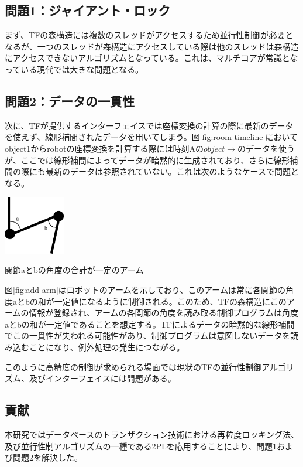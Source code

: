 \documentclass{jarticle}
\begin{document}
\begin{multicols}{2}
\subsection*{問題1：ジャイアント・ロック}
まず、TFの森構造には複数のスレッドがアクセスするため並行性制御が必要となるが、一つのスレッドが森構造にアクセスしている際は他のスレッドは森構造にアクセスできないアルゴリズムとなっている。これは、マルチコアが常識となっている現代では大きな問題となる。

\subsection*{問題2：データの一貫性}
次に、TFが提供するインターフェイスでは座標変換の計算の際に最新のデータを使えず、線形補間されたデータを用いてしまう。図\ref{fig:room-timeline}においてobject1からrobotの座標変換を計算する際には時刻Aの$object \rightarrow$のデータを使うが、ここでは線形補間によってデータが暗黙的に生成されており、さらに線形補間の際にも最新のデータは参照されていない。これは次のようなケースで問題となる。

\begin{figurehere} 
\centering
\includegraphics[width=0.2\textwidth]{add-arm}	
\caption{関節aとbの角度の合計が一定のアーム}
\label{fig:add-arm}
\end{figurehere}

図\ref{fig:add-arm}はロボットのアームを示しており、このアームは常に各関節の角度aとbの和が一定値になるように制御される。このため、TFの森構造にこのアームの情報が登録され、アームの各関節の角度を読み取る制御プログラムは角度aとbの和が一定値であることを想定する。TFによるデータの暗黙的な線形補間でこの一貫性が失われる可能性があり、制御プログラムは意図しないデータを読み込むことになり、例外処理の発生につながる。

このように高精度の制御が求められる場面では現状のTFの並行性制御アルゴリズム、及びインターフェイスには問題がある。

\subsection{貢献}

本研究ではデータベースのトランザクション技術における再粒度ロッキング法、及び並行性制アルゴリズムの一種である2PLを応用することにより、問題1および問題2を解決した。


\end{multicols}
\end{document}
